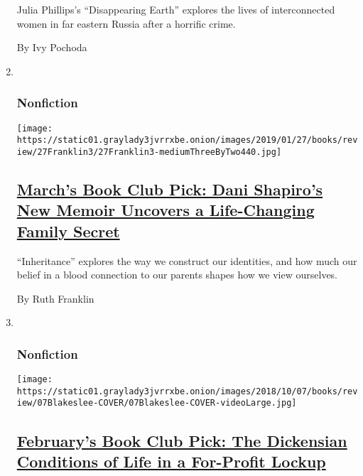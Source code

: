 \begin{enumerate}
  Julia Phillips's ``Disappearing Earth'' explores the lives of
  interconnected women in far eastern Russia after a horrific crime.

  By Ivy Pochoda
\item ~
  \hypertarget{nonfiction}{%
  \subsubsection{Nonfiction}\label{nonfiction}}

  \texttt{[image: https://static01.graylady3jvrrxbe.onion/images/2019/01/27/books/review/27Franklin3/27Franklin3-mediumThreeByTwo440.jpg]}

  \hypertarget{marchs-book-club-pick-dani-shapiros-new-memoir-uncovers-a-life-changing-family-secret}{%
  \subsection{\texorpdfstring{\href{/2019/01/15/books/review/dani-shapiro-inheritance.html}{March's
  Book Club Pick: Dani Shapiro's New Memoir Uncovers a Life-Changing
  Family
  Secret}}{March's Book Club Pick: Dani Shapiro's New Memoir Uncovers a Life-Changing Family Secret}}\label{marchs-book-club-pick-dani-shapiros-new-memoir-uncovers-a-life-changing-family-secret}}

  ``Inheritance'' explores the way we construct our identities, and how
  much our belief in a blood connection to our parents shapes how we
  view ourselves.

  By Ruth Franklin
\item ~
  \hypertarget{nonfiction-1}{%
  \subsubsection{Nonfiction}\label{nonfiction-1}}

  \texttt{[image: https://static01.graylady3jvrrxbe.onion/images/2018/10/07/books/review/07Blakeslee-COVER/07Blakeslee-COVER-videoLarge.jpg]}

  \hypertarget{februarys-book-club-pick-the-dickensian-conditions-of-life-in-a-for-profit-lockup}{%
  \subsection{\texorpdfstring{\href{/2018/10/01/books/review/shane-bauer-american-prison.html}{February's
  Book Club Pick: The Dickensian Conditions of Life in a For-Profit
  Lockup}}{February's Book Club Pick: The Dickensian Conditions of Life in a For-Profit Lockup}}\label{februarys-book-club-pick-the-dickensian-conditions-of-life-in-a-for-profit-lockup}}


\end{enumerate}
